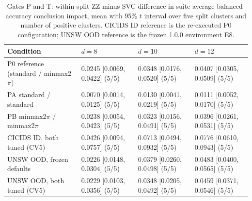 \begin{table}[!t]
\caption{Gates P and T: within-split ZZ-minus-SVC difference in suite-average balanced-accuracy conclusion impact, mean with 95\% $t$ interval over five split clusters and number of positive clusters. CICIDS ID reference is the re-executed P0 configuration; UNSW OOD reference is the frozen 1.0.0 environment E8.}
\label{tab:s-paired}
\centering
\footnotesize
\setlength{\tabcolsep}{4pt}
\begin{tabular}{@{}llll@{}}
\toprule
Condition & $d=8$ & $d=10$ & $d=12$ \\
\midrule
P0 reference (standard / minmax2$\pi$) & 0.0245 [0.0069, 0.0422] (5/5) & 0.0348 [0.0176, 0.0520] (5/5) & 0.0407 [0.0305, 0.0509] (5/5) \\
PA standard / standard & 0.0070 [0.0014, 0.0125] (5/5) & 0.0130 [0.0041, 0.0219] (5/5) & 0.0111 [0.0052, 0.0170] (5/5) \\
PB minmax2$\pi$ / minmax2$\pi$ & 0.0238 [0.0054, 0.0423] (5/5) & 0.0323 [0.0156, 0.0491] (5/5) & 0.0396 [0.0261, 0.0531] (5/5) \\
CICIDS ID, both tuned (CV5) & 0.0426 [0.0094, 0.0757] (5/5) & 0.0713 [0.0494, 0.0932] (5/5) & 0.0776 [0.0610, 0.0943] (5/5) \\
UNSW OOD, frozen defaults & 0.0226 [0.0148, 0.0304] (5/5) & 0.0379 [0.0260, 0.0498] (5/5) & 0.0483 [0.0400, 0.0565] (5/5) \\
UNSW OOD, both tuned (CV5) & 0.0229 [0.0103, 0.0356] (5/5) & 0.0348 [0.0205, 0.0492] (5/5) & 0.0459 [0.0371, 0.0546] (5/5) \\
\bottomrule
\end{tabular}
\end{table}
